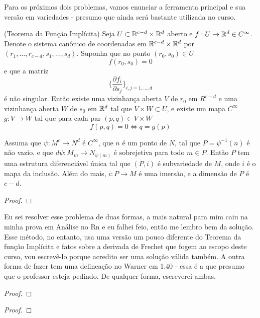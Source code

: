 Para os próximos dois problemas, vamos enunciar a ferramenta principal e sua versão em variedades - presumo que ainda será bastante 
utilizada no curso.
\begin{theorem}
    (Teorema da Função Implícita) Seja $U \subset \mathbb{R}^{c -d}\times \mathbb{R}^d$ aberto e $f: U \rightarrow \mathbb{R}^d \in C^\infty$. Denote o sistema canônico de coordenadas em
    $\mathbb{R}^{c -d}\times \mathbb{R}^d$ por $(r_1, \dots, r_{c-d}, s_1, \dots, s_d)$. Suponha que no ponto $(r_0,s_0) \in U$
    $$f(r_0, s_0) = 0$$
    e que a matriz
    $$\bigg\{\frac{\partial f_i}{\partial s_j}\bigg\}_{i,j = 1,\dots,d}$$
    é não singular. Então existe uma vizinhança aberta $V$ de $r_0$ em $R^{c-d}$ e uma vizinhança aberta $W$ de $s_0$ em $\mathbb{R}^d$
    tal que $V \times W \subset U$, e existe um mapa $C^\infty$ $g:V\to W$ tal que para cada par $(p,q) \in V\times W$
    $$f(p,q) = 0 \iff q = g(p)$$ 
\end{theorem}

\begin{theorem}
    Assuma que $\psi: M^c \to N^d$ é $C^\infty$, que $n$ é um ponto de $N$, tal que $P = \psi^{-1}(n)$ é não vazio, e 
    que $d\psi: M_m \to N_{\psi(m)}$ é sobrejetiva para todo $m \in P$. Então $P$ tem uma estrutura diferenciável única
    tal que $(P,i)$ é subvariedade de $M$, onde $i$ é o mapa da inclusão. Além do mais, $i : P \to M$ é uma imersão, e a dimensão
    de $P$ é $c - d$.
\end{theorem}

\begin{problem}
    \label{prob:l2:3} 
\end{problem}
\begin{proof}
\end{proof}


\begin{problem}
    \label{prob:l2:4} 
\end{problem}
Eu sei resolver esse problema de duas formas, a mais natural para mim caiu na minha prova em Análise no Rn e 
eu falhei feio, então me lembro bem da solução. Esse método, no entanto, usa uma versão um pouco diferente do 
Teorema da função Implícita e fatos sobre a derivada de Frechet que fogem ao escopo deste curso, vou escrevê-lo porque 
acredito ser uma solução válida também. A outra forma de fazer tem uma delineação no Warner em 1.40 - essa é a que presumo
que o professor esteja pedindo. De qualquer forma, escreverei ambas. 
\begin{proof}
    
\end{proof}

\begin{problem}
    \label{prob:l2:5}
\end{problem}
\begin{proof}
    
\end{proof}